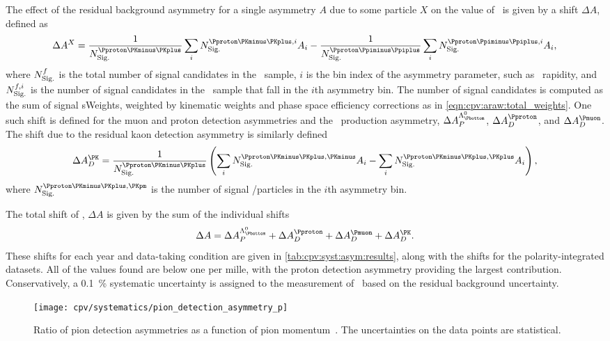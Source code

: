 The effect of the residual background asymmetry for a single asymmetry $A$ due to some particle $X$ on the value of \dACP\ is given by a shift $\Delta{A}$, defined as
\begin{equation}
  \Delta{A}^{X} = \frac{1}{\nsig^{\pKK}}\sum_{i} \nsig^{\pKK,i} A_{i} -
    \frac{1}{\nsig^{\ppipi}}\sum_{i} \nsig^{\ppipi,i} A_{i},
\end{equation}
where $N_{\text{Sig.}}^{f}$ is the total number of signal candidates in the \LcTof\ sample, $i$ is the bin index of the asymmetry parameter, such as \PLambdab\ rapidity, and $N_{\text{Sig.}}^{f,i}$ is the number of signal candidates in the \LcTof\ sample that fall in the $i$th asymmetry bin.
The number of signal candidates is computed as the sum of signal sWeights, weighted by kinematic weights and phase space efficiency corrections as in \cref{eqn:cpv:araw:total_weights}.
One such shift is defined for the muon and proton detection asymmetries and the \PLambdab\ production asymmetry, $\Delta\APLb$, $\Delta\ADp$, and $\Delta\ADmu$.
The shift due to the residual kaon detection asymmetry is similarly defined
\begin{equation}
  \Delta{\ADK} = \frac{1}{\nsig^{\pKK}}\left(%
    \sum_{i} \nsig^{\pKK,\PKminus} A_{i} -
    \sum_{i} \nsig^{\pKK,\PKplus} A_{i}
  \right),
\end{equation}
where $\nsig^{\pKK,\PKpm}$ is the number of signal \PKplus/\PKminus particles in the $i$th asymmetry bin.

The total shift of \dACP, $\Delta{A}$ is given by the sum of the individual shifts
\begin{equation}
  \Delta{A} = \Delta\APLb + \Delta\ADp + \Delta\ADmu + \Delta\ADK.
\end{equation}
These shifts for each year and data-taking condition are given in \cref{tab:cpv:syst:asym:results}, along with the shifts for the polarity-integrated datasets.
All of the values found are below one per mille, with the proton detection asymmetry providing the largest contribution.
Conservatively, a \SI{0.1}{\percent} systematic uncertainty is assigned to the measurement of \dACP\ based on the residual background uncertainty.

\begin{figure}
  \centering
  \texttt{[image: cpv/systematics/pion\_detection\_asymmetry\_p]}
  \caption{%
    Ratio of pion detection asymmetries as a function of pion 
    momentum~\cite{Aaij:2012cy}.
    The uncertainties on the data points are statistical.
  }
  \label{fig:cpv:syst:asym:pion}
\end{figure}

